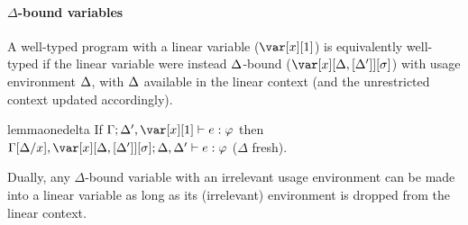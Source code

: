 \documentclass[acmsmall,review,anonymous,screen]{acmart}
\begin{document}
\renewcommand{\DeltaLinearRelationLemma}{
\begin{restatable}[$\Delta$-bound to Linear]{lemma}{deltaone}\label{lem:deltaone}
If $\G,\x[\irr{\D}]; \irr{\D},\D' \vdash e : \vp$ 
then $\G[x/\irr{\D}]; \D',\xl \vdash e :\vp$.
\end{restatable}
}

\renewcommand{\LinearDeltaRelationLemma}{
  \begin{restatable}[Linear to $\Delta$-bound]{lemma}{onedelta}\label{lem:onedelta}
If $\G; \D',\xl \vdash e :\vp$
then $\G[\D/x],\xD; \D,\D' \vdash e : \vp$ ($\Delta$ fresh).
\end{restatable}
}

\renewcommand{\DeltaUnrestrictedRelationLemma}{
\begin{restatable}[Unrestricted and $\Delta$-bound]{lemma}{undelta}\label{lem:undelta}
$\G,\xo; \D \vdash e : \vp$ iff $\G,\x[\cdot]; \D \vdash e : \vp$
\end{restatable}
}

\paragraph{$\Delta$-bound variables} %
A well-typed program with a linear variable ($\xl$) is equivalently
well-typed if the linear variable were instead $\Delta$-bound ($\xD$) with
usage environment $\Delta$, with $\Delta$ available in the linear context (and the unrestricted context updated accordingly).

\LinearDeltaRelationLemma


\noindent Dually, any $\Delta$-bound variable with an irrelevant usage
environment can be made into a linear variable as long as its
(irrelevant) environment is dropped from the linear context.

\end{document}
